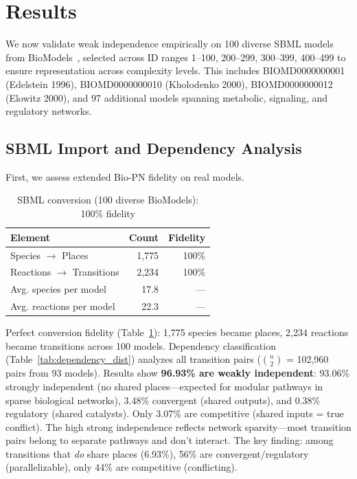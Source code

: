 \documentclass[twocolumn,11pt]{article}
\begin{document}
\section{Results}

We now validate weak independence empirically on 100 diverse SBML models from BioModels~\cite{Malik-Sheriff2020}, selected across ID ranges 1--100, 200--299, 300--399, 400--499 to ensure representation across complexity levels. This includes BIOMD0000000001 (Edelstein 1996), BIOMD0000000010 (Kholodenko 2000), BIOMD0000000012 (Elowitz 2000), and 97 additional models spanning metabolic, signaling, and regulatory networks.

\subsection{SBML Import and Dependency Analysis}

First, we assess extended Bio-PN fidelity on real models.

\begin{table}[H]
\small
\caption{SBML conversion (100 diverse BioModels): 100\% fidelity}
\label{tab:sbml-import-real}
\vspace{-6pt}
\begin{tabular*}{\columnwidth}{@{\extracolsep{\fill}}lrr@{}}
\toprule
\textbf{Element} & \textbf{Count} & \textbf{Fidelity} \\
\midrule
Species $\to$ Places & 1,775 & 100\% \\
Reactions $\to$ Transitions & 2,234 & 100\% \\
Avg. species per model & 17.8 & --- \\
Avg. reactions per model & 22.3 & --- \\
\bottomrule
\end{tabular*}
\vspace{-8pt}
\end{table}

Perfect conversion fidelity (Table~\ref{tab:sbml-import-real}): 1,775 species became places, 2,234 reactions became transitions across 100 models. Dependency classification (Table~\ref{tab:dependency_dist}) analyzes all transition pairs ($\binom{n}{2}$ = 102,960 pairs from 93 models). Results show \textbf{96.93\% are weakly independent}: 93.06\% strongly independent (no shared places---expected for modular pathways in sparse biological networks), 3.48\% convergent (shared outputs), and 0.38\% regulatory (shared catalysts). Only 3.07\% are competitive (shared inputs = true conflict). The high strong independence reflects network sparsity---most transition pairs belong to separate pathways and don't interact. The key finding: among transitions that \emph{do} share places (6.93\%), 56\% are convergent/regulatory (parallelizable), only 44\% are competitive (conflicting).
\end{document}
